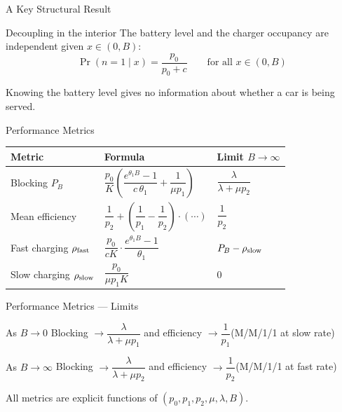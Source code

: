 \documentclass[aspectratio=169]{beamer}
\begin{document}
\begin{frame}{A Key Structural Result}

  \begin{block}{Decoupling in the interior}
    The battery level and the charger occupancy are independent given $x\in(0,B)$:
    \[
      \Pr(n=1 \mid x) = \frac{p_0}{p_0+c} \qquad \text{for all } x\in(0,B)
    \]
  \end{block}

  \bigskip
  Knowing the battery level gives no information about whether a car is being served.

\end{frame}

\begin{frame}{Performance Metrics}

  \renewcommand{\arraystretch}{1.5}
  \begin{tabular}{lll}
    \toprule
    Metric & Formula & Limit $B\to\infty$ \\
    \midrule
    Blocking $P_B$ &
      $\dfrac{p_0}{K}\!\left(\dfrac{e^{\theta_1 B}-1}{c\,\theta_1}+\dfrac{1}{\mu p_1}\right)$ &
      $\dfrac{\lambda}{\lambda+\mu p_2}$ \\[8pt]
    Mean efficiency &
      $\dfrac{1}{p_2}+\!\left(\dfrac{1}{p_1}-\dfrac{1}{p_2}\right)\!\cdot(\cdots)$ &
      $\dfrac{1}{p_2}$ \\[8pt]
    Fast charging $\rho_{\rm fast}$ &
      $\dfrac{p_0}{cK}\cdot\dfrac{e^{\theta_1 B}-1}{\theta_1}$ &
      $P_B - \rho_{\rm slow}$ \\[8pt]
    Slow charging $\rho_{\rm slow}$ &
      $\dfrac{p_0}{\mu p_1 K}$ &
      $0$ \\
    \bottomrule
  \end{tabular}

\end{frame}

\begin{frame}{Performance Metrics — Limits}

  \begin{block}{As $B\to 0$}
    Blocking $\to \dfrac{\lambda}{\lambda+\mu p_1}$ \quad and \quad
    efficiency $\to \dfrac{1}{p_1}$\quad (M/M/1/1 at slow rate)
  \end{block}

  \bigskip
  \begin{block}{As $B\to\infty$}
    Blocking $\to \dfrac{\lambda}{\lambda+\mu p_2}$ \quad and \quad
    efficiency $\to \dfrac{1}{p_2}$\quad (M/M/1/1 at fast rate)
  \end{block}

  \bigskip
  All metrics are explicit functions of $(p_0,p_1,p_2,\mu,\lambda,B)$.

\end{frame}
\end{document}
